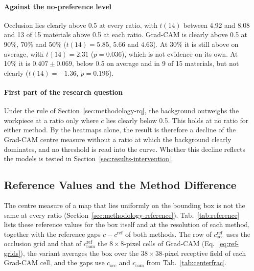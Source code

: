 \paragraph{Against the no-preference level}
Occlusion lies clearly above 0.5 at every ratio, with $t(14)$ between 4.92 and 8.08
and 13 of 15 materials above 0.5 at each ratio. Grad-CAM is clearly above 0.5 at 90\%,
70\% and 50\% ($t(14) = 5.85$, 5.66 and 4.63). At 30\% it is still above on average,
with $t(14) = 2.31$ ($p = 0.036$), which is not evidence on its own. At 10\% it is
$0.407 \pm 0.069$, below 0.5 on average and in 9 of 15 materials, but not clearly
($t(14) = -1.36$, $p = 0.196$).

\paragraph{First part of the research question}
Under the rule of Section~\ref{sec:methodology-rq}, the background outweighs the
workpiece at a ratio only where $c$ lies clearly below 0.5. This holds at no ratio for
either method. By the heatmaps alone, the result is therefore a decline of the Grad-CAM
centre measure without a ratio at which the background clearly dominates, and no
threshold is read into the curve. Whether this decline reflects the models is tested in
Section~\ref{sec:results-intervention}.

\subsection{Reference Values and the Method Difference}
\label{sec:results-reference}

The centre measure of a map that lies uniformly on the bounding box is not the same at
every ratio (Section~\ref{sec:methodology-reference}). Tab.~\ref{tab:reference} lists these
reference values for the box itself and at the resolution of each method, together
with the reference gaps $c - c^{\mathrm{ref}}$ of both methods. The row of
$c^{\mathrm{ref}}_{\mathrm{occ}}$ uses the occlusion grid and that of
$c^{\mathrm{ref}}_{\mathrm{cam}}$ the $8 \times 8$-pixel cells of Grad-CAM
(Eq.~\eqref{eq:ref-grids}), the variant averages the box over the $38 \times 38$-pixel
receptive field of each Grad-CAM cell, and the gaps use $c_{\mathrm{occ}}$ and
$c_{\mathrm{cam}}$ from Tab.~\ref{tab:centerfrac}.

